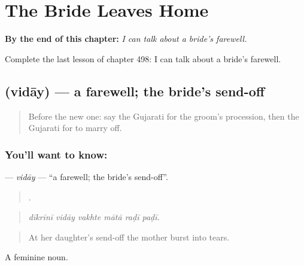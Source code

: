 
\chapter{The Bride Leaves Home}
\label{ch:gu-the-bride-leaves-home}

\begin{chapteropening}
\textbf{By the end of this chapter:} \emph{I can talk about a bride's farewell.}

Complete the last lesson of chapter 498: I can talk about a bride's farewell.
\end{chapteropening}

\section[\texorpdfstring{\gu{વિદાય} (vidāy)}{વિદાય (vidāy)}]{ (vidāy) — a farewell; the bride's send-off}

\label{lesson:GU-C498-viday}



\begin{quote}
Before the new one: say the Gujarati for the groom's procession, then the Gujarati for to marry off.
\end{quote}

\subsection*{You'll want to know: }
\textbf{} — \emph{vidāy} — \textquotedblleft{}a farewell; the bride's send-off\textquotedblright{}.

\begin{quote}
     .
\end{quote}

\begin{quote}
\emph{dīkrīnī vidāy vakhte mātā raḍī paḍī.}
\end{quote}

\begin{quote}
At her daughter's send-off the mother burst into tears.
\end{quote}

A feminine noun.


